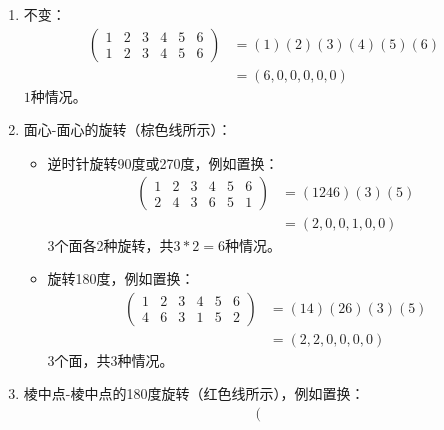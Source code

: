 \begin{solution}
\begin{center}
   \end{center}
   \begin{enumerate}
      \item 不变：
      \begin{align*}
         \left(
            \begin{matrix}
               1 & 2 & 3 & 4 & 5 & 6\\
               1 & 2 & 3 & 4 & 5 & 6
            \end{matrix}
            \right) &= (1)(2)(3)(4)(5)(6) \\
            &= (6,0,0,0,0,0)
      \end{align*}
      $1$种情况。
      \item 面心-面心的旋转（棕色线所示）：
      \begin{itemize}
         \item 逆时针旋转90度或270度，例如置换：
         \begin{align*}
            \left(
               \begin{matrix}
                  1 & 2 & 3 & 4 & 5 & 6\\
                  2 & 4 & 3 & 6 & 5 & 1
               \end{matrix}
               \right) &= (1246)(3)(5) \\
               &= (2,0,0,1,0,0)
         \end{align*}
         3个面各2种旋转，共$3*2 = 6$种情况。
      \item 旋转180度，例如置换：
      \begin{align*}
         \left(
            \begin{matrix}
               1 & 2 & 3 & 4 & 5 & 6\\
               4 & 6 & 3 & 1 & 5 & 2
            \end{matrix}
            \right) &= (14)(26)(3)(5) \\
            &= (2,2,0,0,0,0)
      \end{align*}
      3个面，共$3$种情况。
      \end{itemize}
      \item 棱中点-棱中点的180度旋转（红色线所示），例如置换：
      \begin{align*}
         \left(
            \begin{matrix}

\end{matrix}
\end{align*}
\end{enumerate}
\end{solution}
